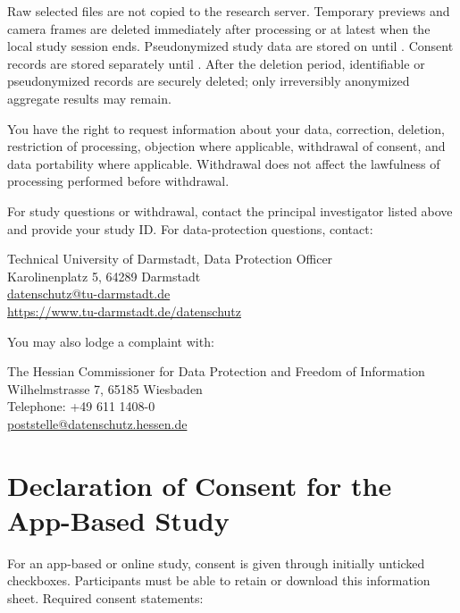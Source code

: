 \documentclass[10pt,a4paper]{article}
\begin{document}
Raw selected files are not copied to the research server. Temporary previews and camera frames are deleted immediately after processing or at latest when the local study session ends. Pseudonymized study data are stored on  until . Consent records are stored separately until . After the deletion period, identifiable or pseudonymized records are securely deleted; only irreversibly anonymized aggregate results may remain.

You have the right to request information about your data, correction, deletion, restriction of processing, objection where applicable, withdrawal of consent, and data portability where applicable. Withdrawal does not affect the lawfulness of processing performed before withdrawal.

For study questions or withdrawal, contact the principal investigator listed above and provide your study ID. For data-protection questions, contact:

Technical University of Darmstadt, Data Protection Officer\\
Karolinenplatz 5, 64289 Darmstadt\\
\href{mailto:datenschutz@tu-darmstadt.de}{datenschutz@tu-darmstadt.de}\\
\url{https://www.tu-darmstadt.de/datenschutz}

You may also lodge a complaint with:

The Hessian Commissioner for Data Protection and Freedom of Information\\
Wilhelmstrasse 7, 65185 Wiesbaden\\
Telephone: +49 611 1408-0\\
\href{mailto:poststelle@datenschutz.hessen.de}{poststelle@datenschutz.hessen.de}

\newpage
\section*{Declaration of Consent for the App-Based Study}

For an app-based or online study, consent is given through initially unticked checkboxes. Participants must be able to retain or download this information sheet. Required consent statements:
\end{document}
